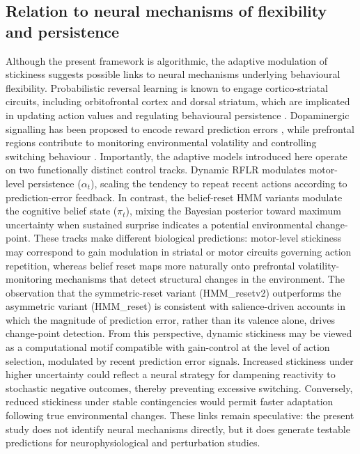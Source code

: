\documentclass[11pt, reprint, aps, prl]{revtex4-2}
\begin{document}
\subsection{Relation to neural mechanisms of flexibility and persistence}
Although the present framework is algorithmic, the adaptive modulation of stickiness suggests possible links to neural mechanisms underlying behavioural flexibility. Probabilistic reversal learning is known to engage cortico-striatal circuits, including orbitofrontal cortex and dorsal striatum, which are implicated in updating action values and regulating behavioural persistence \cite{Izquierdo2017}. Dopaminergic signalling has been proposed to encode reward prediction errors \cite{Schultz1997}, while prefrontal regions contribute to monitoring environmental volatility and controlling switching behaviour \cite{Behrens2007}.
Importantly, the adaptive models introduced here operate on two functionally distinct control tracks. Dynamic RFLR modulates motor-level persistence ($\alpha_t$), scaling the tendency to repeat recent actions according to prediction-error feedback. In contrast, the belief-reset HMM variants modulate the cognitive belief state ($\pi_t$), mixing the Bayesian posterior toward maximum uncertainty when sustained surprise indicates a potential environmental change-point. These tracks make different biological predictions: motor-level stickiness may correspond to gain modulation in striatal or motor circuits governing action repetition, whereas belief reset maps more naturally onto prefrontal volatility-monitoring mechanisms that detect structural changes in the environment. The observation that the symmetric-reset variant (HMM\_resetv2) outperforms the asymmetric variant (HMM\_reset) is consistent with salience-driven accounts in which the magnitude of prediction error, rather than its valence alone, drives change-point detection.
From this perspective, dynamic stickiness may be viewed as a computational motif compatible with gain-control at the level of action selection, modulated by recent prediction error signals. Increased stickiness under higher uncertainty could reflect a neural strategy for dampening reactivity to stochastic negative outcomes, thereby preventing excessive switching. Conversely, reduced stickiness under stable contingencies would permit faster adaptation following true environmental changes. These links remain speculative: the present study does not identify neural mechanisms directly, but it does generate testable predictions for neurophysiological and perturbation studies.
\end{document}
